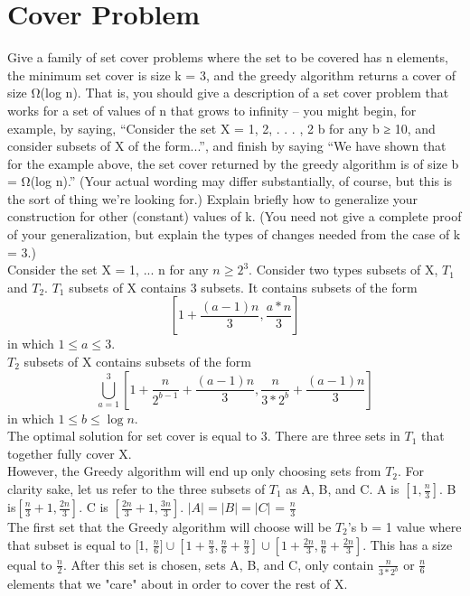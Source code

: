 \documentclass[11pt, solution, letterpaper]{format}
\begin{document}
\section{Cover Problem}
 Give a family of set cover problems where the set to be covered has n elements, the minimum set cover is size k = 3,
and the greedy algorithm returns a cover of size Ω(log n). That is, you should give a description of a set cover problem
that works for a set of values of n that grows to infinity – you might begin, for example, by saying, “Consider the
set X = {1, 2, . . . , 2
b} for any b ≥ 10, and consider subsets of X of the form...”, and finish by saying “We have
shown that for the example above, the set cover returned by the greedy algorithm is of size b = Ω(log n).” (Your
actual wording may differ substantially, of course, but this is the sort of thing we’re looking for.) Explain briefly
how to generalize your construction for other (constant) values of k. (You need not give a complete proof of your
generalization, but explain the types of changes needed from the case of k = 3.)\\

Consider the set X = 1, ... n for any $n \geq 2^3$. Consider two types subsets of X, $T_1$ and $T_2$. $T_1$ subsets of X contains 3 subsets. It contains subsets of the form $${[1 + \frac{(a-1)n}{3}, \frac{a*n}{3}]}$$ in which $1 \leq a \leq 3$. \\

$T_2$ subsets of X contains subsets of the form 
$$\bigcup_{a=1}^{3} [1 + \frac{n}{2^{b-1}} + \frac{(a-1)n}{3}, \frac{n}{3*2^b} + \frac{(a-1)n}{3}]$$
 in which $1 \leq b \leq \log n$. \\


The optimal solution for set cover is equal to 3. There are three sets in $T_1$ that together fully cover X.\\

However, the Greedy algorithm will end up only choosing sets from $T_2$. For clarity sake, let us refer to the three subsets of $T_1$ as A, B, and C. A is $[1, \frac{n}{3}]$. B is$ [\frac{n}{3} + 1, \frac{2n}{3}].$ C is $[\frac{2n}{3} + 1, \frac{3n}{3}]$. $|A| = |B| = |C|$ = $\frac{n}{3}$\\

The first set that the Greedy algorithm will choose will be $T_2$'s b = 1 value where that subset is equal to [1, $\frac{n}{6}] \cup [1 + \frac{n}{3}, \frac{n}{6} + \frac{n}{3}] \cup [1 + \frac{2n}{3}, \frac{n}{6} + \frac{2n}{3}]$. This has a size equal to  $\frac{n}{2}$. After this set is chosen, sets A, B, and C, only contain $\frac{n}{3*2^b}$ or $\frac{n}{6}$ elements that we "care" about in order to cover the rest of X.\\
\end{document}
